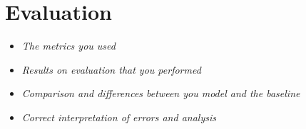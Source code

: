 
\section{Evaluation}
\begin{itemize}
    \item \textit{The metrics you used}
    \item \textit{Results on evaluation that you performed}
    \item \textit{Comparison and differences between you model and the baseline}
    \item \textit{Correct interpretation of errors and analysis}
\end{itemize}